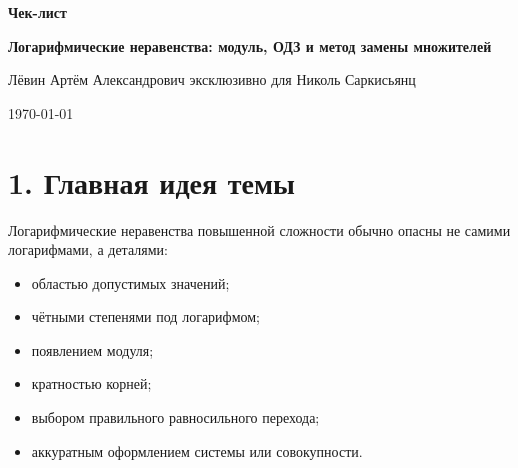 \documentclass[a4paper,12pt]{article}
\newcommand{\topic}{Логарифмические неравенства: модуль, ОДЗ и метод замены множителей}
\newcommand{\student}{Николь Саркисьянц}
\newcommand{\teacher}{Лёвин Артём Александрович}
\begin{document}
\begin{titlepage}
\thispagestyle{empty}
\centering

\vspace*{35mm}

{\Large\textcolor{accent}{\textbf{Чек-лист}}\par}

\vspace{8mm}

{\Huge\textbf{\topic}\par}

\vspace{12mm}

{\large \teacher{} эксклюзивно для \student\par}

\vspace{8mm}

{\large \today\par}

\vfill


\end{titlepage}

\section*{1. Главная идея темы}

Логарифмические неравенства повышенной сложности обычно опасны не самими логарифмами, а деталями:

\begin{itemize}
  \item областью допустимых значений;
  \item чётными степенями под логарифмом;
  \item появлением модуля;
  \item кратностью корней;
  \item выбором правильного равносильного перехода;
  \item аккуратным оформлением системы или совокупности.
\end{itemize}
\end{document}
